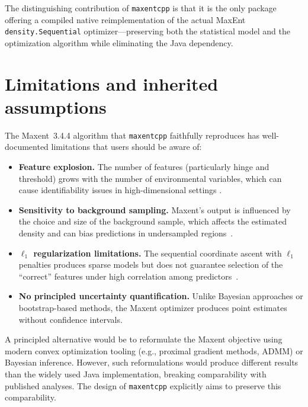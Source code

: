 \documentclass[10pt,letterpaper]{article}
\begin{document}
The distinguishing contribution of \texttt{maxentcpp} is that it is the
only package offering a compiled native reimplementation of the actual
MaxEnt \texttt{density.Sequential} optimizer---preserving both the
statistical model and the optimization algorithm while eliminating the
Java dependency.

\section*{Limitations and inherited assumptions}

The Maxent~3.4.4 algorithm that \texttt{maxentcpp} faithfully reproduces
has well-documented limitations that users should be aware of:

\begin{itemize}[nosep,leftmargin=*]
  \item \textbf{Feature explosion.}
    The number of features (particularly hinge and threshold) grows with
    the number of environmental variables, which can cause
    identifiability issues in high-dimensional settings
    \cite{Elith2011,Merow2013}.

  \item \textbf{Sensitivity to background sampling.}
    Maxent's output is influenced by the choice and size of the
    background sample, which affects the estimated density and can bias
    predictions in undersampled regions~\cite{Phillips2009}.

  \item \textbf{$\ell_1$ regularization limitations.}
    The sequential coordinate ascent with $\ell_1$ penalties produces
    sparse models but does not guarantee selection of the ``correct''
    features under high correlation among predictors~\cite{Hastie2015}.

  \item \textbf{No principled uncertainty quantification.}
    Unlike Bayesian approaches or bootstrap-based methods, the Maxent
    optimizer produces point estimates without confidence intervals.
\end{itemize}

A principled alternative would be to reformulate the Maxent objective
using modern convex optimization tooling (e.g., proximal gradient
methods, ADMM) or Bayesian inference.
However, such reformulations would produce different results than the
widely used Java implementation, breaking comparability with published
analyses.
The design of \texttt{maxentcpp} explicitly aims to preserve this
comparability.
\end{document}
